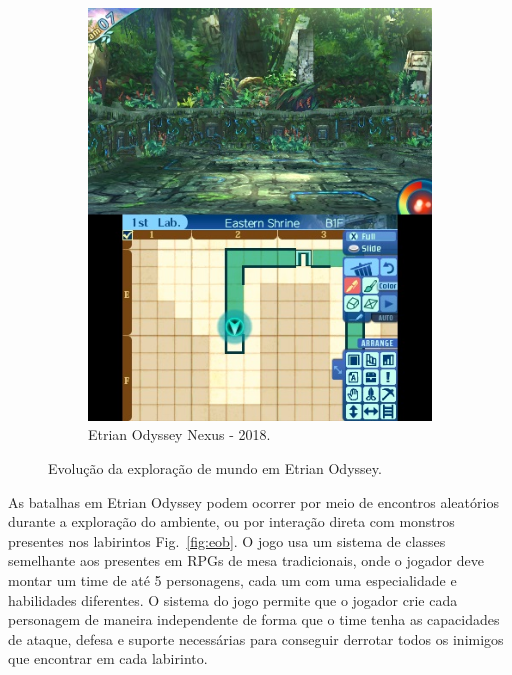\begin{figure}[h!]
\begin{subfigure}[b]{0.44\linewidth}
    \includegraphics[width=\linewidth]{eonexus.jpg}
    \caption{Etrian Odyssey Nexus - 2018.}
  \end{subfigure}
  \caption{Evolução da exploração de mundo em Etrian Odyssey.}
  \label{fig:eo}
\end{figure}

As batalhas em Etrian Odyssey podem ocorrer por meio de encontros aleatórios durante a exploração do ambiente, ou por interação direta com monstros presentes nos labirintos Fig.~\ref{fig:eob}. O jogo usa um sistema de classes semelhante aos presentes em RPGs de mesa tradicionais, onde o jogador deve montar um time de até 5 personagens, cada um com uma especialidade e habilidades diferentes. O sistema do jogo permite que o jogador crie cada personagem de maneira independente de forma que o time tenha as capacidades de ataque, defesa e suporte necessárias para conseguir derrotar todos os inimigos que encontrar em cada labirinto.

